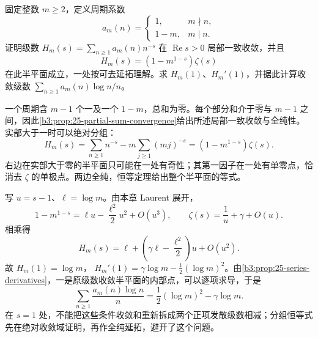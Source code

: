 \begin{exercise}\label{b3:ex:26-4}
固定整数 \(m\ge2\)，定义周期系数
\[
 a_m(n)=
 \begin{cases}
  1,&m\nmid n,\\
  1-m,&m\mid n.
 \end{cases}
\]
证明级数 \(H_m(s)=\sum_{n\ge1}a_m(n)n^{-s}\) 在 \(\operatorname{Re}s>0\) 局部一致收敛，并且
\[
 H_m(s)=(1-m^{1-s})\zeta(s)
\]
在此半平面成立，一处按可去延拓理解。求 \(H_m(1)\)、\(H_m'(1)\)，并据此计算收敛级数 \(\sum_{n\ge1}a_m(n)\log n/n\)。
\end{exercise}
\begin{solution}
一个周期含 \(m-1\) 个一及一个 \(1-m\)，总和为零。每个部分和介于零与 \(m-1\) 之间，因此\cref{b3:prop:25-partial-sum-convergence}给出所述局部一致收敛与全纯性。实部大于一时可以绝对分组：
\[
 H_m(s)=\sum_{n\ge1}n^{-s}-m\sum_{j\ge1}(mj)^{-s}
       =(1-m^{1-s})\zeta(s).
\]
右边在实部大于零的半平面只可能在一处有奇性；其第一因子在一处有单零点，恰消去 \(\zeta\) 的单极点。两边全纯，恒等定理给出整个半平面的等式。

写 \(u=s-1\)、\(\ell=\log m\)。由本章 Laurent 展开，
\[
 1-m^{1-s}=\ell u-\frac{\ell^2}{2}u^2+O(u^3),
 \qquad
 \zeta(s)=\frac1u+\gamma+O(u).
\]
相乘得
\[
 H_m(s)=\ell+\left(\gamma\ell-\frac{\ell^2}{2}\right)u+O(u^2).
\]
故 \(H_m(1)=\log m\)，
\(H_m'(1)=\gamma\log m-\tfrac12(\log m)^2\)。由\cref{b3:prop:25-series-derivatives}，一是原级数收敛半平面的内部点，可以逐项求导，于是
\[
 \sum_{n\ge1}\frac{a_m(n)\log n}{n}
 =\frac12(\log m)^2-\gamma\log m.
\]
在 \(s=1\) 处，不能把这些条件收敛和重新拆成两个正项发散级数相减；分组恒等式先在绝对收敛域证明，再作全纯延拓，避开了这个问题。
\end{solution}

